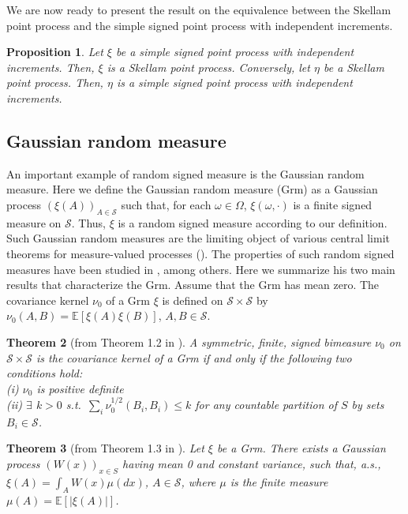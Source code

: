 \documentclass{article}
\theoremstyle{plain}
\newtheorem{theorem}{Theorem}[section]
\newtheorem{proposition}[theorem]{Proposition}
\theoremstyle{remark}
\begin{document}
We are now ready to present the result on the equivalence between the Skellam point process and the simple signed point process with independent increments.

\begin{proposition}\label{pro-Skellam}
	Let $\xi$ be a simple signed point process with independent increments. Then, $\xi$ is a Skellam point process. Conversely, let $\eta$ be a Skellam point process. Then, $\eta$ is a simple signed point process with independent increments.
\end{proposition}





\subsection{Gaussian random measure}
An important example of random signed measure is the Gaussian random measure. Here we define the Gaussian random measure (Grm) as a Gaussian process $(\xi(A))_{A\in\mathcal{S}}$ such that, for each $\omega\in\Omega$, $\xi(\omega,\cdot)$ is a finite signed measure on $\mathcal{S}$. Thus, $\xi$ is a random signed measure according to our definition. Such Gaussian random measures are the limiting object of various central limit theorems for measure-valued processes (\citet{Karr}). The properties of such random signed measures have been studied in \citet{Horo-Gauss}, among others. Here we summarize his two main results that characterize the Grm. Assume that the Grm has mean zero. The covariance kernel $\nu_0$ of a Grm $\xi$ is defined on $\mathcal{S}\times\mathcal{S}$ by $\nu_0(A,B)=\mathbb{E}[\xi(A)\xi(B)]$, $A,B\in\mathcal{S}$.

\begin{theorem}[from Theorem 1.2 in \citet{Horo-Gauss}]\label{thm-Horo-1} A symmetric, finite, signed bimeasure $\nu_0$ on $\mathcal{S}\times \mathcal{S}$ is the covariance kernel of a Grm if and only if the following two conditions hold:
	\\ \textnormal{(i)} $\nu_0$ is positive definite
	\\ \textnormal{(ii)}  $\exists$  $k>0$ s.t.~$\sum_{i}\nu_0^{1/2}(B_i,B_i)\leq k $ for any countable partition of $S$ by sets $B_i\in\mathcal{S}$.
\end{theorem}
\begin{theorem}[from Theorem 1.3 in \citet{Horo-Gauss}]\label{thm-Horo-2} Let $\xi$ be a Grm. There exists a Gaussian process $(W(x))_{x\in S}$ having mean 0 and constant variance, such that, a.s., $\xi(A) = \int_{A} W(x)\mu(dx)$, $A\in\mathcal{S}$, where $\mu$ is the finite measure $\mu(A)=\mathbb{E}[|\xi(A)|]$.
\end{theorem}
\end{document}
